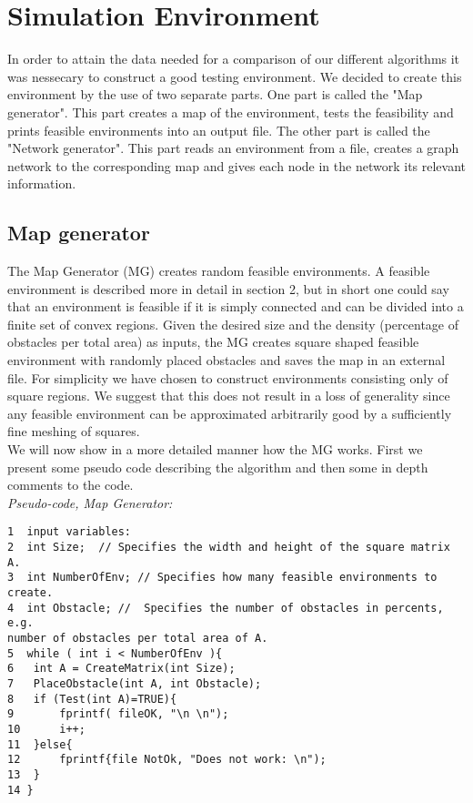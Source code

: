 \chapter{Simulation Environment}
In order to attain the data needed for a comparison of our different algorithms it was nessecary to construct a good testing environment. We decided to create this environment by the use of two separate parts. One part is called the "Map generator". This part creates a map of the environment, tests the feasibility and prints feasible environments into an output file. The other part is called the "Network generator". This part reads an environment from a file, creates a graph network to the corresponding map and gives each node in the network its relevant information.\\

\section{Map generator}
The Map Generator (MG) creates random feasible environments. A feasible environment is described more in detail in section 2, but in short one could say that an environment is feasible if it is simply connected and can be divided into a finite set of convex regions. Given the desired size and the density (percentage of obstacles per total area) as inputs, the MG creates square shaped feasible environment with randomly placed obstacles and saves the map in an external file. For simplicity we have chosen to construct environments consisting only of square regions. We suggest that this does not result in a loss of generality since any feasible environment can be approximated arbitrarily good by a sufficiently fine meshing of squares. \\
We will now show in a more detailed manner how the MG works. First we present some pseudo code describing the algorithm and then some in depth comments to the code.\\
\noindent\emph{Pseudo-code, Map Generator:}
\begin{verbatim}
1  input variables:
2  int Size;  // Specifies the width and height of the square matrix  A.
3  int NumberOfEnv; // Specifies how many feasible environments to create.
4  int Obstacle; //  Specifies the number of obstacles in percents, e.g. 
number of obstacles per total area of A.
5  while ( int i < NumberOfEnv ){
6  	int A = CreateMatrix(int Size); 
7  	PlaceObstacle(int A, int Obstacle);
8  	if (Test(int A)=TRUE){ 
9 		fprintf( fileOK, "\n \n");
10 		i++;
11	}else{
12 		fprintf{file NotOk, "Does not work: \n");
13 	}
14 }
\end{verbatim}

